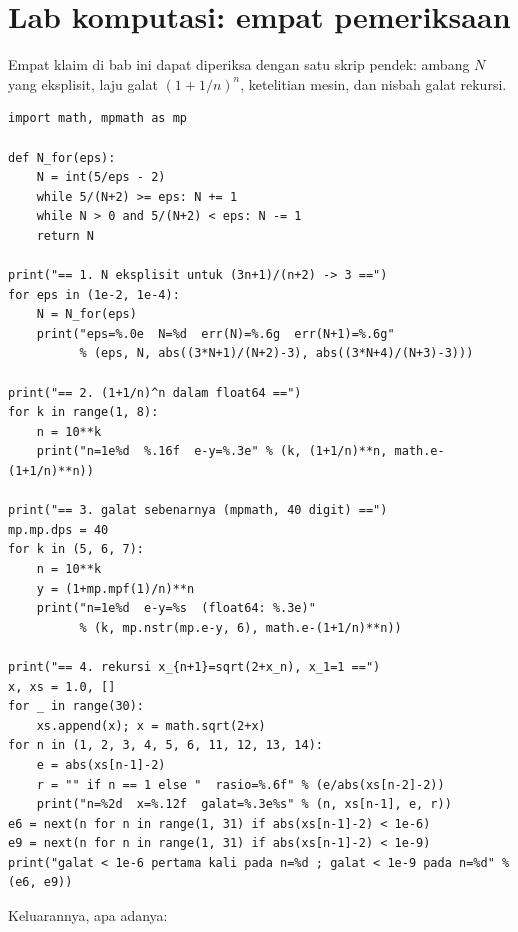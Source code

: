 \section{Lab komputasi: empat pemeriksaan}


Empat klaim di bab ini dapat diperiksa dengan satu skrip pendek: ambang $N$ yang
eksplisit, laju galat $(1+1/n)^n$, ketelitian mesin, dan nisbah galat rekursi.

\begin{lab}
\begin{verbatim}
import math, mpmath as mp

def N_for(eps):
    N = int(5/eps - 2)
    while 5/(N+2) >= eps: N += 1
    while N > 0 and 5/(N+2) < eps: N -= 1
    return N

print("== 1. N eksplisit untuk (3n+1)/(n+2) -> 3 ==")
for eps in (1e-2, 1e-4):
    N = N_for(eps)
    print("eps=%.0e  N=%d  err(N)=%.6g  err(N+1)=%.6g"
          % (eps, N, abs((3*N+1)/(N+2)-3), abs((3*N+4)/(N+3)-3)))

print("== 2. (1+1/n)^n dalam float64 ==")
for k in range(1, 8):
    n = 10**k
    print("n=1e%d  %.16f  e-y=%.3e" % (k, (1+1/n)**n, math.e-(1+1/n)**n))

print("== 3. galat sebenarnya (mpmath, 40 digit) ==")
mp.mp.dps = 40
for k in (5, 6, 7):
    n = 10**k
    y = (1+mp.mpf(1)/n)**n
    print("n=1e%d  e-y=%s  (float64: %.3e)"
          % (k, mp.nstr(mp.e-y, 6), math.e-(1+1/n)**n))

print("== 4. rekursi x_{n+1}=sqrt(2+x_n), x_1=1 ==")
x, xs = 1.0, []
for _ in range(30):
    xs.append(x); x = math.sqrt(2+x)
for n in (1, 2, 3, 4, 5, 6, 11, 12, 13, 14):
    e = abs(xs[n-1]-2)
    r = "" if n == 1 else "  rasio=%.6f" % (e/abs(xs[n-2]-2))
    print("n=%2d  x=%.12f  galat=%.3e%s" % (n, xs[n-1], e, r))
e6 = next(n for n in range(1, 31) if abs(xs[n-1]-2) < 1e-6)
e9 = next(n for n in range(1, 31) if abs(xs[n-1]-2) < 1e-9)
print("galat < 1e-6 pertama kali pada n=%d ; galat < 1e-9 pada n=%d" % (e6, e9))
\end{verbatim}
\end{lab}

\newpage
Keluarannya, apa adanya:

